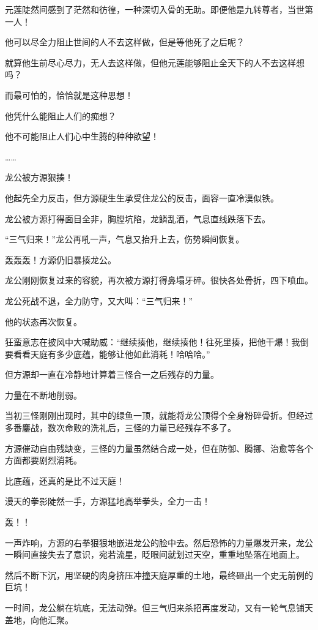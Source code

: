 \begin{this_body}
元莲陡然间感到了茫然和彷徨，一种深切入骨的无助。即便他是九转尊者，当世第一人！

他可以尽全力阻止世间的人不去这样做，但是等他死了之后呢？

就算他生前尽心尽力，无人去这样做，但他元莲能够阻止全天下的人不去这样想吗？

而最可怕的，恰恰就是这种思想！

他凭什么能阻止人们的痴想？

他不可能阻止人们心中生腾的种种欲望！

……

龙公被方源狠揍！

他起先全力反击，但方源硬生生承受住龙公的反击，面容一直冷漠似铁。

龙公被方源打得面目全非，胸膛坑陷，龙鳞乱洒，气息直线跌落下去。

“三气归来！”龙公再吼一声，气息又抬升上去，伤势瞬间恢复。

轰轰轰！方源仍旧暴揍龙公。

龙公刚刚恢复过来的容貌，再次被方源打得鼻塌牙碎。很快各处骨折，四下喷血。

龙公死战不退，全力防守，又大叫：“三气归来！”

他的状态再次恢复。

狂蛮意志在披风中大喊助威：“继续揍他，继续揍他！往死里揍，把他干爆！我倒要看看天庭有多少底蕴，能够让他如此消耗！哈哈哈。”

但方源却一直在冷静地计算着三怪合一之后残存的力量。

力量在不断地削弱。

当初三怪刚刚出现时，其中的绿鱼一顶，就能将龙公顶得个全身粉碎骨折。但经过多番鏖战，数次命败的洗礼后，三怪的力量已经残存不多了。

方源催动自由残缺变，三怪的力量虽然结合成一处，但在防御、腾挪、治愈等各个方面都要剧烈消耗。

比底蕴，还真的是比不过天庭！

漫天的拳影陡然一手，方源猛地高举拳头，全力一击！

轰！！

一声炸响，方源的右拳狠狠地嵌进龙公的脸中去。然后恐怖的力量爆发开来，龙公一瞬间直接失去了意识，宛若流星，眨眼间就划过天空，重重地坠落在地面上。

然后不断下沉，用坚硬的肉身挤压冲撞天庭厚重的土地，最终砸出一个史无前例的巨坑！

一时间，龙公躺在坑底，无法动弹。但三气归来杀招再度发动，又有一轮气息铺天盖地，向他汇聚。


\end{this_body}
